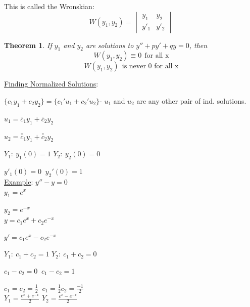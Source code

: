 \documentclass[12pt]{article}
\numberwithin{equation}{subsection}
\newtheorem{theorem}{Theorem}[section]
\newcommand{\indb}{\hspace{1cm}}
\newcommand{\indd}{\hspace{2cm}}
\newcommand{\indn}{\hspace{7cm}}
\newcommand{\indp}{\hspace{8cm}}
\newcommand{\inds}{\hspace{9.5cm}}
\newcommand{\exa}{\noindent \underline{Example}: \hspace{1cm}}
\begin{document}
\newpage
This is called the Wronskian:
\begin{equation}
W(y_1,y_2)=
\begin{vmatrix}
y_1 & y_2\\
y'_1 & y'_2
\end{vmatrix}
\end{equation}

\begin{theorem}
If $y_1$ and $y_2$ are solutions to $y''+py'+qy=0$, then
\begin{equation}
W(y_1,y_2)\equiv 0\ \  \text{for all x}
\end{equation}
\begin{equation}
W(y_1,y_2)\ \ \textrm{is never 0 for all x}
\end{equation}
\end{theorem}

\underline{Finding Normalized Solutions}:

$\{ c_1y_1+c_2y_2\}=\{ c_1'u_1+c_2'u_2\}$- $u_1$ and $u_2$ are any other pair of ind. solutions.

\inds $u_1=\bar{c}_1y_1+\bar{c}_2y_2$

\inds $u_2=\bar{\bar{c}}_1y_1+\bar{\bar{c}}_2y_2$

$Y_1:\ y_1(0)=1$ \hspace{3cm} $Y_2:\ y_2(0)=0$

\indb $y'_1(0)=0$ \hspace{3.5cm} $\ y_2'(0)=1$\\

\exa $y''-y=0$\\

\indd $y_1=e^x$

\indd $y_2=e^{-x}$\\

\indb $y=c_1e^x+c_2e^{-x}$

\indb $y'=c_1e^x-c_2e^{-x}$

\indn $Y_1:\ c_1 + c_2=1$ \hspace{3cm} $Y_2:\ c_1 + c_2=0$

\indp $c_1 - c_2=0$ \hspace{3.5cm} $\ c_1 - c_2=1$

\indp $c_1 = c_2=\frac{1}{2}$ \hspace{3.5cm} $\ c_1= \frac{1}{2} c_2=\frac{-1}{2}$\\

\indn $Y_1=\frac{e^x+e^{-x}}{2}$ \hspace{3cm} $Y_2= \frac{e^x-e^{-x}}{2}$
\end{document}
